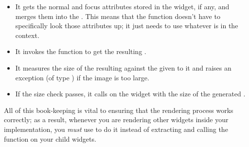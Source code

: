 \begin{itemize}
\item It gets the normal and focus attributes stored in the widget, if
  any, and merges them into the .  This means that
  the  function doesn't have to specifically look those
  attributes up; it just needs to use whatever is in the context.
\item It invokes the  function to get the resulting
  .
\item It measures the size of the resulting  against the
   given to it and raises an exception (of type
  ) if the image is too large.
\item If the size check passes, it calls  on the
  widget with the size of the generated .
\end{itemize}

All of this book-keeping is vital to ensuring that the rendering
process works correctly; as a result, whenever you are rendering other
widgets inside your  implementation, you \textit{must}
use  to do it instead of extracting and calling the
 function on your child widgets.

